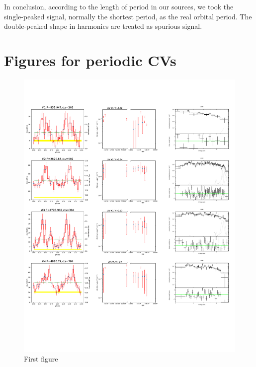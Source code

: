 \documentclass[twoside,twocolumn]{aastex63}
\begin{document}
 In conclusion, according to the length of period in our sources, we took the single-peaked signal, normally the shortest period, as the real orbital period. The double-peaked shape in harmonics are treated as spurious signal. 




\section{Figures for periodic CVs }
\begin{figure}[htbp]
    \centering
    \includegraphics[page=1,scale=0.90,trim=5 50 0 20,clip]{plot_figure_LW.pdf}
    \caption{First figure \label{fig:Figure_p}}
  \end{figure}
  
\end{document}
